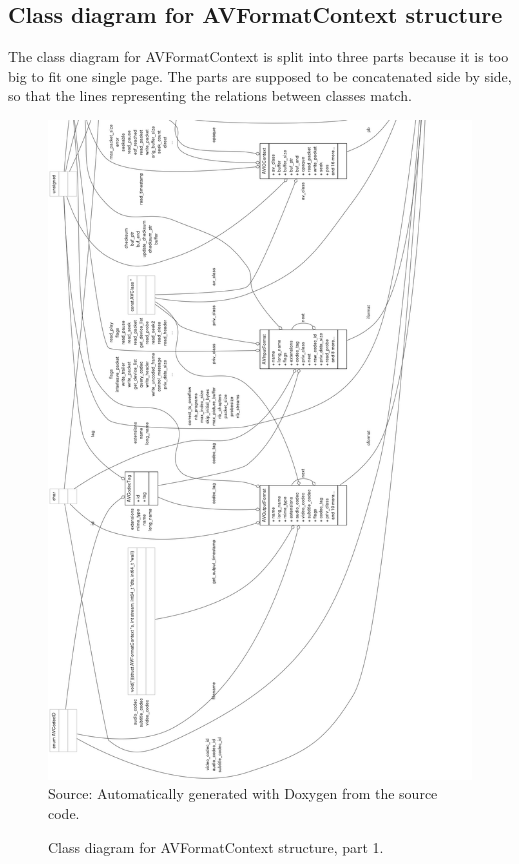 \documentclass[
	12pt,				%
	openright,			%
	twoside,			%
	a4paper,			%
	brazil,
	french,				%
	english
	]{abntex2}
\begin{document}
\begin{apendicesenv}
\chapter{Class diagram for AVFormatContext structure}
\label{avformatcontext_class_diagram}

The class diagram for AVFormatContext is split into three parts because it is too big to fit one single page. The parts are supposed to be concatenated side by side, so that the lines representing the relations between classes match.

\begin{figure}[!hb]
\centering
\caption{Class diagram for AVFormatContext structure, part 1.}
\includegraphics[width=0.9\linewidth]{figuras/structAVFormatContext__coll__graph_1.png}
\\Source: Automatically generated with Doxygen from the source code.
\label{fig:structAVFormatContext__coll__graph_1}
\end{figure}


\end{apendicesenv}
\end{document}
